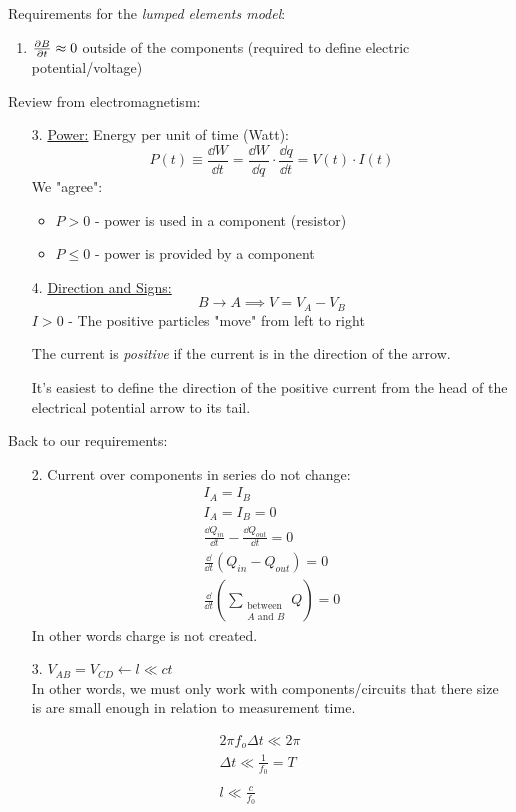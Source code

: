 \documentclass[00_complete]{subfiles}
\begin{document}
Requirements for the \emph{lumped elements model}:
\begin{enumerate}
    \item $\pdv{B}{t} \approx 0$ outside of the components (required to define
        electric potential/voltage)
\end{enumerate}
\begin{reminder}
    Review from electromagnetism:
   \begin{enumerate}
       \item[3.] \underline{Power:} Energy per unit of time (Watt):
           \[
               P(t) \equiv \frac{\dd{W}}{\dd{t}}
               = \frac{\dd{W}}{\dd{q}} \cdot \frac{\dd{q}}{\dd{t}}
               = V(t) \cdot I(t)
           \]
           We "agree":
           \begin{itemize}
                \item $P > 0$ - power is used in a component (resistor)
                \item $P \leq 0$ - power is provided by a component
           \end{itemize}
        \item[4.] \underline{Direction and Signs:}
            \[
                B \to A \implies V = V_A-V_B
            \]
            $I > 0$ - The positive particles "move" from left to right

            The current is \emph{positive} if the current is in the direction
            of the arrow.
            \begin{note}
            It's easiest to define the direction of the positive current from
            the head of the electrical potential arrow to its tail.
            \end{note}
   \end{enumerate}
\end{reminder}
Back to our requirements:
\begin{enumerate}
    \item[2.] Current over components in series do not change:
        \begin{gather*}
            I_A=I_B \\ I_A=I_B=0 \\
            \frac{\dd{Q_{in}}}{\dd{t}}-\frac{\dd{Q_{out}}}{\dd{t}} = 0 \\
            \frac{\dd}{\dd{t}}(Q_{in}-Q_{out}) = 0 \\
        \frac{\dd}{\dd{t}}\left(\sum
        _{\substack{\text{between} \\ A \text{ and } B}} Q\right) = 0
        \end{gather*}
        In other words charge is not created.
    \item[3.] $V_{AB}=V_{CD} \leftarrow l \ll ct$ \\
        In other words, we must only work with components/circuits that there
        size is are small enough in relation to measurement time.
\end{enumerate}
\begin{gather*}
    2\pi f_o\Delta t \ll 2\pi \\
    \Delta t \ll \frac{1}{f_0} = T \\\\
    l \ll \frac{c}{f_0}
\end{gather*}
\end{document}
